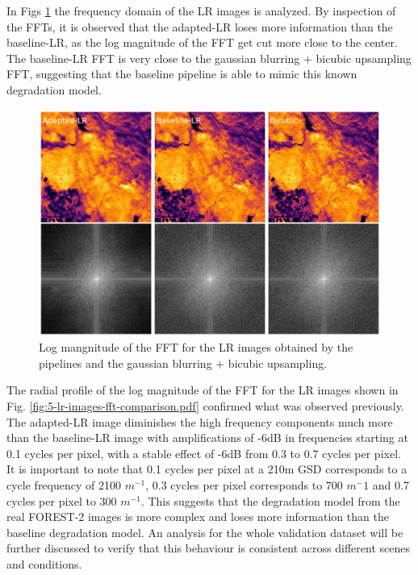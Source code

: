         In Figs \ref{fig:5-lr-images-fft.pdf} the frequency domain of the LR images is analyzed.
        By inspection of the FFTs, it is observed that the adapted-LR loses more information than the baseline-LR, as the log magnitude of the FFT get cut more close to the center.
        The baseline-LR FFT is very close to the gaussian blurring + bicubic upsampling FFT, suggesting that the baseline pipeline is able to mimic this known degradation model.

        \begin{figure}[H]
            \centering
            \includegraphics[scale=0.3]{Includes/5-lr-images-fft.pdf}
            \caption{Log mangnitude of the FFT for the LR images obtained by the pipelines and the gaussian blurring + bicubic upsampling.}
            \label{fig:5-lr-images-fft.pdf}
        \end{figure}

        The radial profile of the log magnitude of the FFT for the LR images shown in Fig. \ref{fig:5-lr-images-fft-comparison.pdf} confirmed what was observed previously.
        The adapted-LR image diminishes the high frequency components much more than the baseline-LR image with amplifications of -6dB in frequencies starting at 0.1 cycles per pixel, with a stable effect of -6dB from 0.3 to 0.7 cycles per pixel. 
        It is important to note that 0.1 cycles per pixel at a 210m GSD corresponds to a cycle frequency of 2100 $m^{-1}$, 0.3 cycles per pixel corresponds to 700 $m^-1$ and 0.7 cycles per pixel to 300 $m^{-1}$.
        This suggests that the degradation model from the real FOREST-2 images is more complex and loses more information than the baseline degradation model.
        An analysis for the whole validation dataset will be further discussed to verify that this behaviour is consistent across different scenes and conditions.


